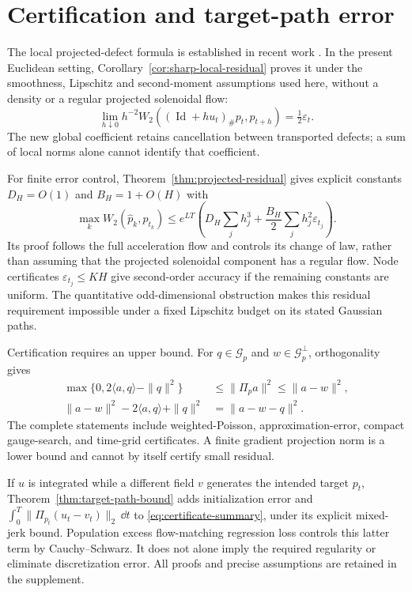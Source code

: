 \section{Certification and target-path error}
\label{sec:certificate-summary}

The local projected-defect formula is established in recent work
\citep{obzherin2026density,obzherin2026finite}.  In the present
Euclidean setting, Corollary~\ref{cor:sharp-local-residual} proves it
under the smoothness, Lipschitz and second-moment assumptions used here,
without a density or a regular projected solenoidal flow:
\[
 \lim_{h\downarrow0}h^{-2}
 W_2((\operatorname{Id}+hu_t)_\#p_t,p_{t+h})
 =\tfrac12\varepsilon_t.
\]
The new global coefficient retains cancellation between transported
defects; a sum of local norms alone cannot identify that coefficient.

For finite error control, Theorem~\ref{thm:projected-residual} gives
explicit constants $D_H=O(1)$ and $B_H=1+O(H)$ with
\begin{equation}
 \max_k W_2(\widehat p_k,p_{t_k})
 \le e^{LT}\left(D_H\sum_jh_j^3+
                    \frac{B_H}{2}\sum_jh_j^2\varepsilon_{t_j}\right).
 \label{eq:certificate-summary}
\end{equation}
Its proof follows the full acceleration flow and controls its change of
law, rather than assuming that the projected solenoidal component has a
regular flow.  Node certificates $\varepsilon_{t_j}\le K H$ give
second-order accuracy if the remaining constants are uniform.
The quantitative odd-dimensional obstruction makes this residual
requirement impossible under a fixed Lipschitz budget on its stated
Gaussian paths.

Certification requires an upper bound.  For
$q\in\mathcal G_p$ and $w\in\mathcal G_p^\perp$, orthogonality gives
\begin{align*}
 \max\{0,2\langle a,q\rangle-\|q\|^2\}
 &\le\|\Pi_pa\|^2\le\|a-w\|^2,\\
 \|a-w\|^2-2\langle a,q\rangle+\|q\|^2
 &=\|a-w-q\|^2.
\end{align*}
The complete statements include weighted-Poisson, approximation-error,
compact gauge-search, and time-grid certificates.  A finite gradient
projection norm is a lower bound and cannot by itself certify small
residual.

If $u$ is integrated while a different field $v$ generates the intended
target $p_t$, Theorem~\ref{thm:target-path-bound} adds initialization
error and
$\int_0^T\|\Pi_{p_t}(u_t-v_t)\|_2\,\dd t$ to
\eqref{eq:certificate-summary}, under its explicit mixed-jerk bound.
Population excess flow-matching regression loss controls this latter
term by Cauchy--Schwarz.  It does not alone imply the required regularity
or eliminate discretization error.  All proofs and precise assumptions
are retained in the supplement.
